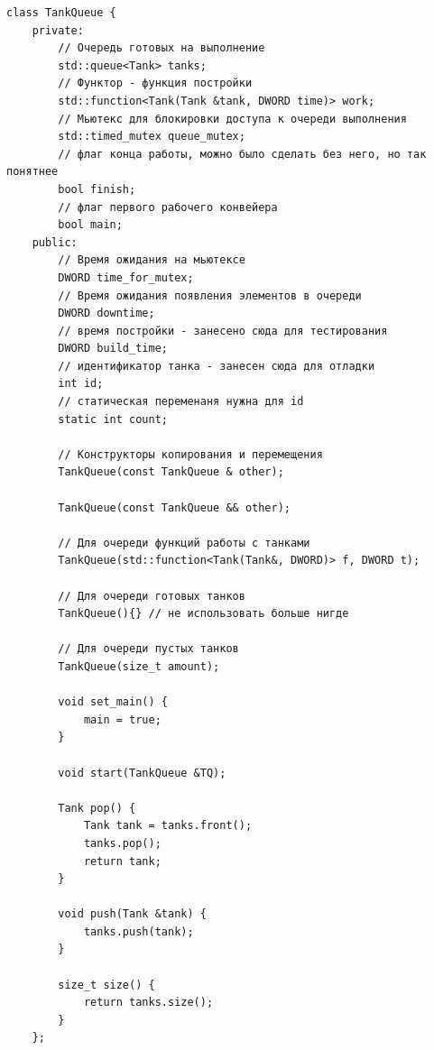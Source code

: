 \documentclass[a4paper, 14pt]{article}
\begin{document}
    		\begin{lstlisting}[label=code:TankQueue,caption=Класс TankQueue]
        class TankQueue {
    private:
        // Очередь готовых на выполнение
        std::queue<Tank> tanks;
        // Функтор - функция постройки
        std::function<Tank(Tank &tank, DWORD time)> work;
        // Мьютекс для блокировки доступа к очереди выполнения
        std::timed_mutex queue_mutex;
        // флаг конца работы, можно было сделать без него, но так понятнее
        bool finish;
        // флаг первого рабочего конвейера
        bool main;
    public:
        // Время ожидания на мьютексе
        DWORD time_for_mutex;
        // Время ожидания появления элементов в очереди
        DWORD downtime;
        // время постройки - занесено сюда для тестирования
        DWORD build_time;
        // идентификатор танка - занесен сюда для отладки
        int id;
        // статическая переменаня нужна для id
        static int count;
    
        // Конструкторы копирования и перемещения
        TankQueue(const TankQueue & other);
    
        TankQueue(const TankQueue && other);
    
        // Для очереди функций работы с танками
        TankQueue(std::function<Tank(Tank&, DWORD)> f, DWORD t);
    
        // Для очереди готовых танков
        TankQueue(){} // не использовать больше нигде
    
        // Для очереди пустых танков
        TankQueue(size_t amount);
    
        void set_main() {
            main = true;
        }
    
        void start(TankQueue &TQ);
    
        Tank pop() {
            Tank tank = tanks.front();
            tanks.pop();
            return tank;
        }
    
        void push(Tank &tank) {
            tanks.push(tank);
        }
    
        size_t size() {
            return tanks.size();
        }
    };
	\end{lstlisting}
	
\end{document}
